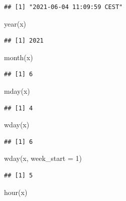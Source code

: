 \documentclass[
]{book}
\newenvironment{Shaded}{\begin{snugshade}}{\end{snugshade}}
\newcommand{\AttributeTok}[1]{\textcolor[rgb]{0.77,0.63,0.00}{#1}}
\newcommand{\DecValTok}[1]{\textcolor[rgb]{0.00,0.00,0.81}{#1}}
\newcommand{\FunctionTok}[1]{\textcolor[rgb]{0.00,0.00,0.00}{#1}}
\newcommand{\NormalTok}[1]{#1}
\begin{document}
\begin{verbatim}
## [1] "2021-06-04 11:09:59 CEST"
\end{verbatim}

\begin{Shaded}
\begin{Highlighting}[]
\FunctionTok{year}\NormalTok{(x)}
\end{Highlighting}
\end{Shaded}

\begin{verbatim}
## [1] 2021
\end{verbatim}

\begin{Shaded}
\begin{Highlighting}[]
\FunctionTok{month}\NormalTok{(x)}
\end{Highlighting}
\end{Shaded}

\begin{verbatim}
## [1] 6
\end{verbatim}

\begin{Shaded}
\begin{Highlighting}[]
\FunctionTok{mday}\NormalTok{(x)}
\end{Highlighting}
\end{Shaded}

\begin{verbatim}
## [1] 4
\end{verbatim}

\begin{Shaded}
\begin{Highlighting}[]
\FunctionTok{wday}\NormalTok{(x)}
\end{Highlighting}
\end{Shaded}

\begin{verbatim}
## [1] 6
\end{verbatim}

\begin{Shaded}
\begin{Highlighting}[]
\FunctionTok{wday}\NormalTok{(x, }\AttributeTok{week\_start =} \DecValTok{1}\NormalTok{)}
\end{Highlighting}
\end{Shaded}

\begin{verbatim}
## [1] 5
\end{verbatim}

\begin{Shaded}
\begin{Highlighting}[]
\FunctionTok{hour}\NormalTok{(x)}
\end{Highlighting}
\end{Shaded}
\end{document}
